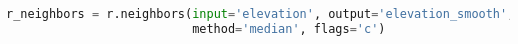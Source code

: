 \documentclass{standalone}
\begin{document}
\begin{lstlisting}[language=Python,linewidth=34.2em]
r_neighbors = r.neighbors(input='elevation', output='elevation_smooth',
                          method='median', flags='c')
\end{lstlisting}
\end{document}
